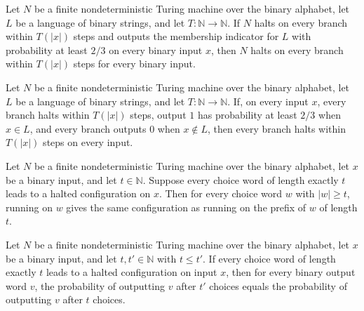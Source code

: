 \begin{theorem}
\label{Turing.FinNDTM.BPDecidesInTime.runsInTime}
\leanok
{}
Let $N$ be a finite nondeterministic Turing machine over the binary alphabet, let $L$ be
a language of binary strings, and let $T\colon\mathbb{N}\to\mathbb{N}$. If $N$ halts on
every branch within $T(|x|)$ steps and outputs the membership indicator for $L$ with
probability at least $2/3$ on every binary input $x$, then $N$ halts on every branch
within $T(|x|)$ steps for every binary input.
\end{theorem}

\begin{theorem}
\label{Turing.FinNDTM.RDecidesInTime.runsInTime}
\leanok
{}
Let $N$ be a finite nondeterministic Turing machine over the binary alphabet, let $L$ be
a language of binary strings, and let $T:\mathbb{N}\to\mathbb{N}$. If, on every input
$x$, every branch halts within $T(|x|)$ steps, output $1$ has probability at least $2/3$
when $x\in L$, and every branch outputs $0$ when $x\notin L$, then every branch halts
within $T(|x|)$ steps on every input.
\end{theorem}

\begin{theorem}
\label{Turing.FinNDTM.runWith_eq_runWith_take}
\leanok
{}
Let $N$ be a finite nondeterministic Turing machine over the binary alphabet, let $x$ be
a binary input, and let $t\in\mathbb{N}$. Suppose every choice word of length exactly
$t$ leads to a halted configuration on $x$. Then for every choice word $w$ with $|w|\geq
t$, running on $w$ gives the same configuration as running on the prefix of $w$ of
length $t$.
\end{theorem}

\begin{theorem}
\label{Turing.FinNDTM.outputProb_eq_of_haltsWithin}
\leanok
{}
Let $N$ be a finite nondeterministic Turing machine over the binary alphabet, let $x$ be
a binary input, and let $t,t'\in\mathbb{N}$ with $t\le t'$. If every choice word of
length exactly $t$ leads to a halted configuration on input $x$, then for every binary
output word $v$, the probability of outputting $v$ after $t'$ choices equals the
probability of outputting $v$ after $t$ choices.
\end{theorem}

